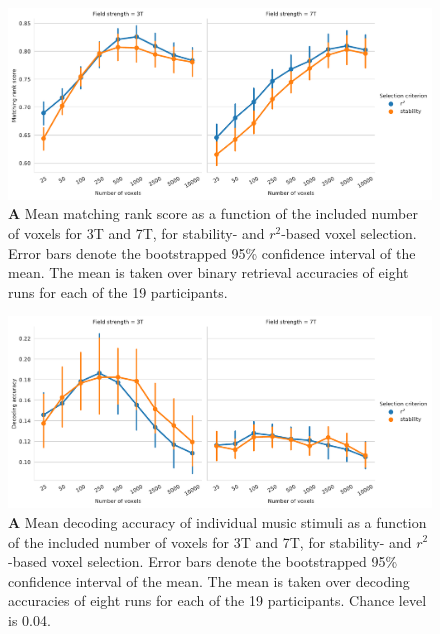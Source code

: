 \begin{figure}[H]
  \centering
    \includegraphics[width=\linewidth]{pics/rank_selection.pdf}
	
  \caption{\textbf{A} Mean matching rank score as a function of the included number
  of voxels for 3T and 7T, for stability- and $r^2$-based voxel selection.
  Error bars denote the bootstrapped 95\% confidence interval of the mean. The
  mean is taken over binary retrieval accuracies of eight runs for each of the
  19 participants.}

 \label{fig:matching_score_selection}
\end{figure}


\begin{figure}[H]
  \centering
    \includegraphics[width=\linewidth]{pics/decoding_selection.pdf}

	\caption{\textbf{A} Mean decoding accuracy of individual music stimuli as a function of
  the included number of voxels for 3T and 7T, for stability- and
  $r^2$-based voxel selection. Error bars denote the bootstrapped 95\%
  confidence interval of the mean. The mean is taken over decoding
  accuracies of eight runs for each of the 19 participants. Chance level is
    0.04.
}
 \label{fig:decoding_accuracy_stimulus_selection}
\end{figure}

